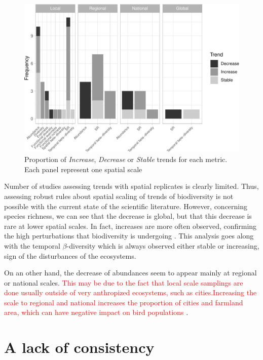 \documentclass[
  12pt,
  oneside]{report}
\begin{document}
\begin{figure}
\centering
\includegraphics{literature_review_files/figure-latex/barmetricsperspatscale-1.pdf}
\caption{\label{fig:barmetricsperspatscale}Proportion of \emph{Increase}, \emph{Decrease} or \emph{Stable} trends for each metric. Each panel represent one spatial scale}
\end{figure}

Number of studies assessing trends with spatial replicates is clearly limited. Thus, assessing robust rules about spatial scaling of trends of biodiversity is not possible with the current state of the scientific literature. However, concerning species richness, we can see that the decrease is global, but that this decrease is rare at lower spatial scales. In fact, increases are more often observed, confirming the high perturbations that biodiversity is undergoing \autocite{dornelas_assemblage_2014,vaidyanathan_worlds_2021}. This analysis goes along with the temporal \(\beta\)-diversity which is always observed either stable or increasing, sign of the disturbances of the ecosystems.

On an other hand, the decrease of abundances seem to appear mainly at regional or national scales. \textcolor{red}{This may be due to the fact that local scale samplings are done usually outside of very anthropized  ecosystems, such as cities.Increasing the scale to regional and national increases the proportion of cities and farmland area, which can have negative impact on bird populations} \autocite{reif_long-term_2013}.

\hypertarget{a-lack-of-consistency}{%
\chapter{A lack of consistency}\label{a-lack-of-consistency}}
\end{document}
